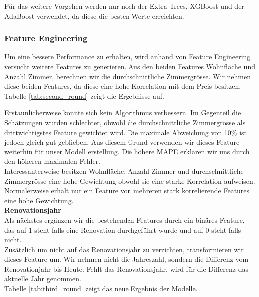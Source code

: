 Für das weitere Vorgehen werden nur noch der Extra Trees, XGBoost und der AdaBoost verwendet, da diese die besten Werte erreichten.
\subsubsection{Feature Engineering}
Um eine bessere Performance zu erhalten, wird anhand von Feature Engineering versucht weitere Features zu generieren. Aus den beiden Features Wohnfläche und Anzahl Zimmer, berechnen wir die durchschnittliche Zimmergrösse. Wir nehmen diese beiden Features, da diese eine hohe Korrelation mit dem Preis besitzen. Tabelle \ref{tab:second_round} zeigt die Ergebnisse auf.

\begin{table}[ht]
\centering
{}
\caption{Ergebnisse mit durchschnittlicher Zimmergrösse}
\label{tab:second_round}
\end{table}

Erstaunlicherweise konnte sich kein Algorithmus verbessern. Im Gegenteil die Schätzungen wurden schlechter, obwohl die durchschnittliche Zimmergrösse als drittwichtigstes Feature gewichtet wird. Die maximale Abweichung von 10\% ist jedoch gleich gut geblieben. Aus diesem Grund verwenden wir dieses Feature weiterhin für unser Modell erstellung. Die höhere MAPE erklären wir uns durch den höheren maximalen Fehler.\\
Interessanterweise besitzen Wohnfläche, Anzahl Zimmer und durchschnittliche Zimmergrösse eine hohe Gewichtung obwohl sie eine starke Korrelation aufweisen. Normalerweise erhält nur ein Feature von mehreren stark korrelierende Features eine hohe Gewichtung.\\[2ex]
%
\textbf{Renovationsjahr}\\
Als nächstes ergänzen wir die bestehenden Features durch ein binäres Feature, das auf 1 steht falls eine Renovation durchgeführt wurde und auf 0 steht falls nicht.\\
Zusätzlich um nicht auf das Renovationsjahr zu verzichten, transformieren wir dieses Feature um. Wir nehmen nicht die Jahreszahl, sondern die Differenz vom Renovationjahr bis Heute. Fehlt das Renovationsjahr, wird für die Differenz das aktuelle Jahr genommen.\\
Tabelle \ref{tab:third_round} zeigt das neue Ergebnis der Modelle.

